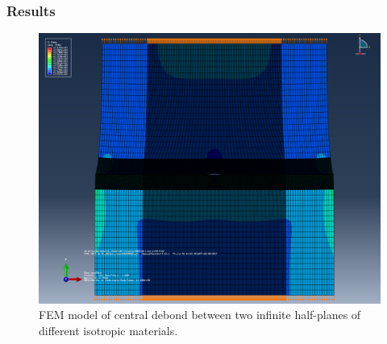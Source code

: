 \documentclass[first,firstsupp,lastsupp,handout,last,hyperref,table]{ETHclass}
\begin{document}
\begin{frame}
\frametitle{Results}
\vspace{-0.7cm}
\centering
\captionsetup[figure]{font=scriptsize,labelfont=scriptsize}
\begin{figure}[!h]
\centering
\includegraphics[height=0.7\textheight]{BIM-plate.png}
  \caption{\scriptsize FEM model of central debond between two infinite half-planes of different isotropic materials.}
  \label{fig:res7}
\end{figure}
\end{frame}
\end{document}
